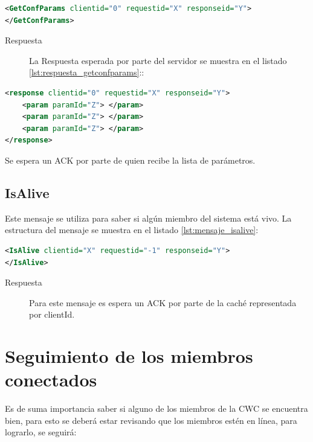 \begin{lstlisting}[language=XML,caption={Mensaje de GetConfParams},label={lst:mensaje_getconfparams}]
<GetConfParams clientid="0" requestid="X" responseid="Y"> 
</GetConfParams>
\end{lstlisting}


\begin{description}
\item[Respuesta] La Respuesta esperada por parte del servidor se muestra en el listado \ref{lst:respuesta_getconfparams}::
\end{description}

\begin{lstlisting}[language=XML,caption={Mensaje de Respuesta de GetConfParams},label={lst:respuesta_getconfparams}]
<response clientid="0" requestid="X" responseid="Y"> 
	<param paramId="Z"> </param>
	<param paramId="Z"> </param>
	<param paramId="Z"> </param>
</response>
\end{lstlisting}


Se espera un ACK por parte de quien recibe la lista de parámetros.

\subsection{IsAlive}

Este mensaje se utiliza para saber si algún miembro del sistema está vivo. La estructura del mensaje se muestra en el listado \ref{lst:mensaje_isalive}:

\begin{lstlisting}[language=XML,caption={Mensaje de IsAlive},label={lst:mensaje_isalive}]
<IsAlive clientid="X" requestid="-1" responseid="Y"> 
</IsAlive>
\end{lstlisting}

\begin{description}
\item[Respuesta] Para este mensaje es espera un ACK por parte de la caché representada por clientId.
\end{description}

\section{Seguimiento de los miembros conectados}

Es de suma importancia saber si alguno de los miembros de la CWC se encuentra bien, para esto se deberá estar revisando que los miembros estén en línea, para lograrlo, se seguirá:

